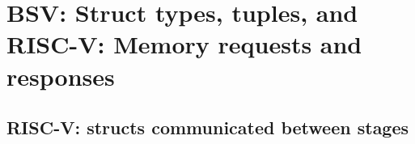 

\chapter{BSV: Struct types, tuples, and\\
RISC-V: Memory requests and responses}


\setcounter{page}{1}
\renewcommand{\thepage}{\arabic{chapter}-\arabic{page}}

\label{ch_Structs_Mem_Reqs_Rsps}


\section{RISC-V: structs communicated between stages}


